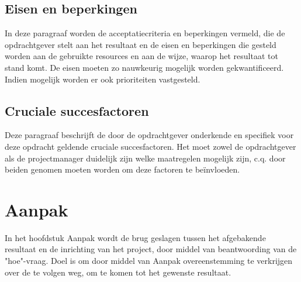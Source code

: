\documentclass{article}
\begin{document}
\subsection{Eisen en beperkingen}
In deze paragraaf worden de acceptatiecriteria en beperkingen vermeld,
die de opdrachtgever stelt aan het resultaat en de eisen en beperkingen die gesteld worden aan de gebruikte resources en aan de wijze,
waarop het resultaat tot stand komt.
De eisen moeten zo nauwkeurig mogelijk worden gekwantificeerd.
Indien mogelijk worden er ook prioriteiten vastgesteld.

\subsection{Cruciale succesfactoren}
Deze paragraaf beschrijft de door de opdrachtgever onderkende en specifiek voor deze opdracht geldende cruciale succesfactoren.
Het moet zowel de opdrachtgever als de projectmanager duidelijk zijn welke maatregelen mogelijk zijn,
c.q. door beiden genomen moeten worden om deze factoren te beïnvloeden.








\section{Aanpak}

In het hoofdstuk Aanpak wordt de brug geslagen tussen het afgebakende resultaat en de inrichting van het project,
door middel van beantwoording van de "hoe"-vraag.
Doel is om door middel van Aanpak overeenstemming te verkrijgen over de te volgen weg, om te komen tot het gewenste resultaat.
\end{document}
